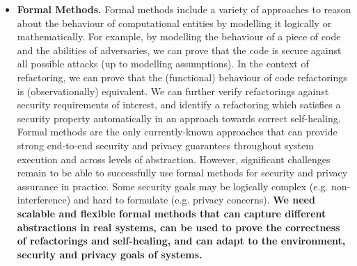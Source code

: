 \documentclass[a4paper,11pt]{article}
\begin{document}
\begin{itemize}
\item \textbf{Formal Methods.}
Formal methods include a variety of approaches to reason about the behaviour
of computational entities by modelling it logically or mathematically. For example, by modelling the behaviour of a piece of code and the abilities of adversaries, we can prove that the code is secure against all possible attacks (up to modelling assumptions). In the context of refactoring, we can prove that the (functional) behaviour of code refactorings
is (observationally) equivalent. We can further verify refactorings against security requirements of interest, and identify a refactoring which satisfies a security property automatically in an approach towards correct self-healing.
Formal methods
are the only currently-known approaches that can provide strong end-to-end security and privacy guarantees throughout system execution and across levels of abstraction. However, significant challenges remain to be able to
successfully use formal methods for security and privacy assurance in practice.
Some security goals may be logically complex (e.g. non-interference) and hard to formulate (e.g. privacy concerns).
\textbf{We need scalable and flexible formal methods that can capture different abstractions in real systems, can be used to prove the correctness of refactorings and self-healing, and can adapt to the environment, security and privacy goals of systems.}


\end{itemize}
\end{document}
